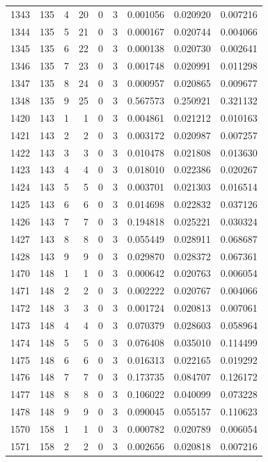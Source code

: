 \begin{longtable}{rrrrrrrrr}
1343 & 135 & 4 & 20 & 0 & 3 & 0.001056 & 0.020920 & 0.007216 \\
1344 & 135 & 5 & 21 & 0 & 3 & 0.000167 & 0.020744 & 0.004066 \\
1345 & 135 & 6 & 22 & 0 & 3 & 0.000138 & 0.020730 & 0.002641 \\
1346 & 135 & 7 & 23 & 0 & 3 & 0.001748 & 0.020991 & 0.011298 \\
1347 & 135 & 8 & 24 & 0 & 3 & 0.000957 & 0.020865 & 0.009677 \\
1348 & 135 & 9 & 25 & 0 & 3 & 0.567573 & 0.250921 & 0.321132 \\
1420 & 143 & 1 & 1 & 0 & 3 & 0.004861 & 0.021212 & 0.010163 \\
1421 & 143 & 2 & 2 & 0 & 3 & 0.003172 & 0.020987 & 0.007257 \\
1422 & 143 & 3 & 3 & 0 & 3 & 0.010478 & 0.021808 & 0.013630 \\
1423 & 143 & 4 & 4 & 0 & 3 & 0.018010 & 0.022386 & 0.020267 \\
1424 & 143 & 5 & 5 & 0 & 3 & 0.003701 & 0.021303 & 0.016514 \\
1425 & 143 & 6 & 6 & 0 & 3 & 0.014698 & 0.022832 & 0.037126 \\
1426 & 143 & 7 & 7 & 0 & 3 & 0.194818 & 0.025221 & 0.030324 \\
1427 & 143 & 8 & 8 & 0 & 3 & 0.055449 & 0.028911 & 0.068687 \\
1428 & 143 & 9 & 9 & 0 & 3 & 0.029870 & 0.028372 & 0.067361 \\
1470 & 148 & 1 & 1 & 0 & 3 & 0.000642 & 0.020763 & 0.006054 \\
1471 & 148 & 2 & 2 & 0 & 3 & 0.002222 & 0.020767 & 0.004066 \\
1472 & 148 & 3 & 3 & 0 & 3 & 0.001724 & 0.020813 & 0.007061 \\
1473 & 148 & 4 & 4 & 0 & 3 & 0.070379 & 0.028603 & 0.058964 \\
1474 & 148 & 5 & 5 & 0 & 3 & 0.076408 & 0.035010 & 0.114499 \\
1475 & 148 & 6 & 6 & 0 & 3 & 0.016313 & 0.022165 & 0.019292 \\
1476 & 148 & 7 & 7 & 0 & 3 & 0.173735 & 0.084707 & 0.126172 \\
1477 & 148 & 8 & 8 & 0 & 3 & 0.106022 & 0.040099 & 0.073228 \\
1478 & 148 & 9 & 9 & 0 & 3 & 0.090045 & 0.055157 & 0.110623 \\
1570 & 158 & 1 & 1 & 0 & 3 & 0.000782 & 0.020789 & 0.006054 \\
1571 & 158 & 2 & 2 & 0 & 3 & 0.002656 & 0.020818 & 0.007216 \\

\end{longtable}
